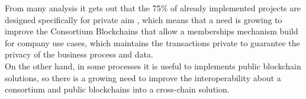 From many analysis it gets out that the 75\% of already implemented projects are designed specifically for 
private aim \cite{blockchain-state},
which means that a need is growing to improve the Consortium Blockchains that allow a memberships 
mechanism build for company use cases, which maintains the transactions private to guarantee the privacy of 
the business process and data.
\\
On the other hand, in some processes it is useful to implements public blockchain solutions, so there is a growing need to 
improve the interoperability about a consortium and public blockchains into a cross-chain solution.



